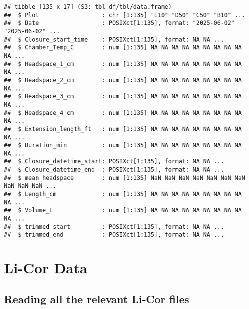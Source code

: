 \documentclass[
]{article}
\newenvironment{Shaded}{\begin{snugshade}}{\end{snugshade}}
\newcommand{\CommentTok}[1]{\textcolor[rgb]{0.56,0.35,0.01}{\textit{#1}}}
\newcommand{\DecValTok}[1]{\textcolor[rgb]{0.00,0.00,0.81}{#1}}
\newcommand{\FunctionTok}[1]{\textcolor[rgb]{0.13,0.29,0.53}{\textbf{#1}}}
\newcommand{\NormalTok}[1]{#1}
\newcommand{\OtherTok}[1]{\textcolor[rgb]{0.56,0.35,0.01}{#1}}
\newcommand{\SpecialCharTok}[1]{\textcolor[rgb]{0.81,0.36,0.00}{\textbf{#1}}}
\begin{document}
\begin{Shaded}
\end{Shaded}

\begin{verbatim}
## tibble [135 x 17] (S3: tbl_df/tbl/data.frame)
##  $ Plot                  : chr [1:135] "E10" "D50" "C50" "B10" ...
##  $ Date                  : POSIXct[1:135], format: "2025-06-02" "2025-06-02" ...
##  $ Closure_start_time    : POSIXct[1:135], format: NA NA ...
##  $ Chamber_Temp_C        : num [1:135] NA NA NA NA NA NA NA NA NA NA ...
##  $ Headspace_1_cm        : num [1:135] NA NA NA NA NA NA NA NA NA NA ...
##  $ Headspace_2_cm        : num [1:135] NA NA NA NA NA NA NA NA NA NA ...
##  $ Headspace_3_cm        : num [1:135] NA NA NA NA NA NA NA NA NA NA ...
##  $ Headspace_4_cm        : num [1:135] NA NA NA NA NA NA NA NA NA NA ...
##  $ Extension_length_ft   : num [1:135] NA NA NA NA NA NA NA NA NA NA ...
##  $ Duration_min          : num [1:135] NA NA NA NA NA NA NA NA NA NA ...
##  $ Closure_datetime_start: POSIXct[1:135], format: NA NA ...
##  $ Closure_datetime_end  : POSIXct[1:135], format: NA NA ...
##  $ mean_headspace        : num [1:135] NaN NaN NaN NaN NaN NaN NaN NaN NaN NaN ...
##  $ Length_cm             : num [1:135] NA NA NA NA NA NA NA NA NA NA ...
##  $ Volume_L              : num [1:135] NA NA NA NA NA NA NA NA NA NA ...
##  $ trimmed_start         : POSIXct[1:135], format: NA NA ...
##  $ trimmed_end           : POSIXct[1:135], format: NA NA ...
\end{verbatim}

\section{Li-Cor Data}\label{li-cor-data}

\subsection{Reading all the relevant Li-Cor
files}\label{reading-all-the-relevant-li-cor-files}
\end{document}
